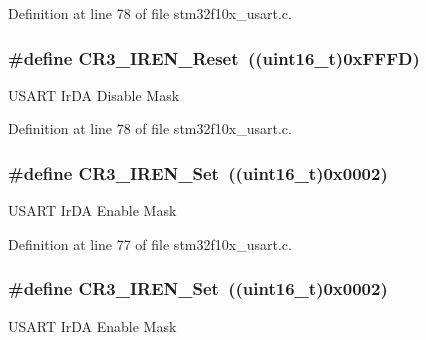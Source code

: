 Definition at line 78 of file stm32f10x\+\_\+usart.\+c.

\subsubsection[{\texorpdfstring{C\+R3\+\_\+\+I\+R\+E\+N\+\_\+\+Reset}{CR3_IREN_Reset}}]{\setlength{\rightskip}{0pt plus 5cm}\#define C\+R3\+\_\+\+I\+R\+E\+N\+\_\+\+Reset~(({\bf uint16\+\_\+t})0x\+F\+F\+F\+D)}\hypertarget{group___u_s_a_r_t___private___defines_gad1520358de97e48fe18780e5cc5296bd}{}\label{group___u_s_a_r_t___private___defines_gad1520358de97e48fe18780e5cc5296bd}
U\+S\+A\+RT Ir\+DA Disable Mask 

Definition at line 78 of file stm32f10x\+\_\+usart.\+c.

\subsubsection[{\texorpdfstring{C\+R3\+\_\+\+I\+R\+E\+N\+\_\+\+Set}{CR3_IREN_Set}}]{\setlength{\rightskip}{0pt plus 5cm}\#define C\+R3\+\_\+\+I\+R\+E\+N\+\_\+\+Set~(({\bf uint16\+\_\+t})0x0002)}\hypertarget{group___u_s_a_r_t___private___defines_gad5dd1d08f3836f9a3c3f3cc0c66a8b8f}{}\label{group___u_s_a_r_t___private___defines_gad5dd1d08f3836f9a3c3f3cc0c66a8b8f}
U\+S\+A\+RT Ir\+DA Enable Mask 

Definition at line 77 of file stm32f10x\+\_\+usart.\+c.

\subsubsection[{\texorpdfstring{C\+R3\+\_\+\+I\+R\+E\+N\+\_\+\+Set}{CR3_IREN_Set}}]{\setlength{\rightskip}{0pt plus 5cm}\#define C\+R3\+\_\+\+I\+R\+E\+N\+\_\+\+Set~(({\bf uint16\+\_\+t})0x0002)}\hypertarget{group___u_s_a_r_t___private___defines_gad5dd1d08f3836f9a3c3f3cc0c66a8b8f}{}\label{group___u_s_a_r_t___private___defines_gad5dd1d08f3836f9a3c3f3cc0c66a8b8f}
U\+S\+A\+RT Ir\+DA Enable Mask 

